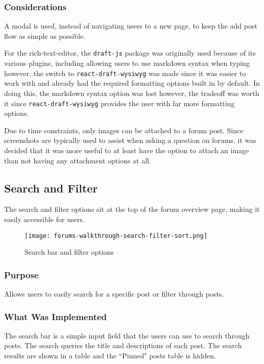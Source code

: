 \subsubsection{Considerations}
A modal is used, instead of navigating users to a new page, to keep the add post flow as simple as possible.

For the rich-text-editor, the \texttt{draft-js} package was originally used because of its various plugins, including allowing users to use markdown syntax when typing
however, the switch to \texttt{react-draft-wysiwyg} was made since it was easier to work with and already had the required formatting options built in by default.
In doing this, the markdown syntax option was lost however, the tradeoff was worth it since \texttt{react-draft-wysiwyg} provides the user with far more formatting options.

Due to time constraints, only images can be attached to a forum post.
Since screenshots are typically used to assist when asking a question on forums, it was decided that it was more useful to at least have the option to attach an image than not having any attachment options at all.

\subsection{Search and Filter}
The search and filter options sit at the top of the forum overview page, making it easily accessible for users.

\newpage

\begin{figure}[h!]
    \texttt{[image: forums-walkthrough-search-filter-sort.png]}
    \centering
    \caption{Search bar and filter options}
\end{figure}

\subsubsection{Purpose}
Allows users to easily search for a specific post or filter through posts.

\subsubsection{What Was Implemented}
The search bar is a simple input field that the users can use to search through posts.
The search queries the title and descriptions of each post.
The search results are shown in a table and the ``Pinned" posts table is hidden.

